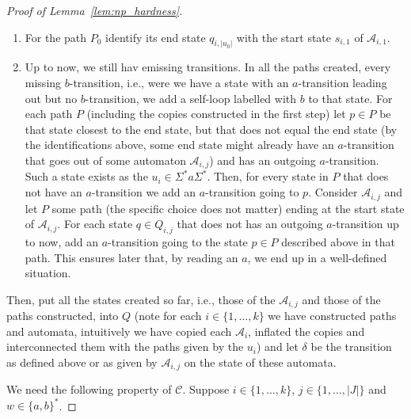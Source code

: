 \begin{toappendix}
\begin{proof}[Proof of Lemma~\ref{lem:np_hardness}]
\begin{enumerate}
 \item For the path $P_0$ identify its end state $q_{i,|u_0|}$
  with the start state $s_{i,1}$ of $\mathcal A_{i,1}$.
     
 \item Up to now, we still hav emissing transitions. In all the paths created, 
  every missing $b$-transition, i.e., were we have a state with an $a$-transition
  leading out but no $b$-transition, we add a self-loop labelled with $b$ to that state.
  For each path $P$ (including the copies constructed in the first step)
  let $p \in P$ be that state closest to the end state, but that does not equal
  the end state (by the identifications above, some end state might already have an $a$-transition
  that goes out of some automaton $\mathcal A_{i,j}$) and has an outgoing $a$-transition.
  Such a state exists as the $u_i \in \Sigma^* a \Sigma^*$.
  Then, for every state in $P$ that does not have an $a$-transition
  we add an $a$-transition going to $p$.
  Consider $\mathcal A_{i,j}$ and let $P$ some path (the specific choice does not matter)
  ending at the start state of $\mathcal A_{i,j}$.
  For each state $q \in Q_{i,j}$ that does not has an outgoing $a$-transition up to now,
  add an $a$-transition going to the state $p \in P$ described above in that path.
  This ensures later that, by reading an $a$, we end up in a well-defined situation.
 \end{enumerate}
 Then, put all the states created so far, i.e., those of the $\mathcal A_{i,j}$
 and those of the paths constructed, into $Q$ (note for each $i \in \{1,\ldots,k\}$
 we have constructed paths and automata, intuitively we have copied each $\mathcal A_i$, inflated
 the copies and interconnected them with the paths given by the $u_i$)
 and let $\delta$ be the transition as defined above or as given by $\mathcal A_{i,j}$
 on the state of these automata.
 
 
 We need the following property of $\mathcal C$. Suppose $i \in \{1,\ldots,k\}$, 
 $j \in \{1,\ldots,|J|\}$ and $w \in \{a,b\}^*$.
 
  \medskip 
 

\end{proof}
\end{toappendix}
